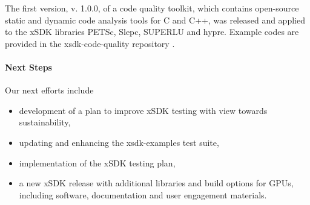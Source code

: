 The first version, v. 1.0.0, of a code quality toolkit, which contains open-source static and dynamic code analysis tools for C and C++, was released and applied to the xSDK libraries PETSc, Slepc, SUPERLU and hypre. Example codes are provided in the xsdk-code-quality repository \cite{xsdk-code-quality}.

\paragraph{Next Steps}

Our next efforts include 
\begin{itemize}
    \item development of a plan to improve xSDK testing with view towards sustainability,
    \item updating and enhancing the xsdk-examples test suite,
    \item implementation of the xSDK testing plan,
   \item a new xSDK release with additional libraries and build options for GPUs, including software, documentation and user engagement materials.
\end{itemize}

\newpage

